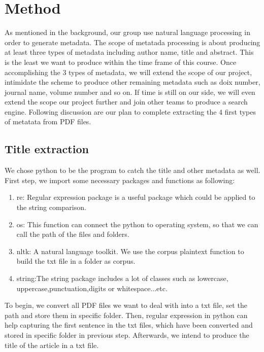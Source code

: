 \section*{Method}
As mentioned in the background, our group use natural language processing in order to generate metadata. 
The scope of metatada processing is about producing at least three types of metadata including author name, title and abstract. 
This is the least we want to produce within the time frame of this course. 
Once accomplishing the 3 types of metadata, we will extend the scope of our project, intimidate the scheme to produce other remaining metadata such as doix number, journal name, volume number and so on. 
If time is still on our side, we will even extend the scope our project further and join other teams to produce a search engine. 
Following discussion are our plan to complete extracting the 4 first types of metatata from PDF files.
\subsection*{Title extraction}
We chose python to be the program to catch the title and other metadata as well. 
First step, we import some necessary packages and functions as following:
\begin{enumerate}
	\item re: Regular expression package is a useful package which could be applied to the string comparison.
	\item os: This function can connect the python to operating system, so that we can call the path of the files and folders.
	\item nltk: A natural language toolkit. We use the corpus plaintext function to build the txt file in a folder as corpus.
	\item string:The string package includes a lot of classes such as lowercase, uppercase,punctuation,digits or whitespace...etc. 
\end{enumerate}  
To begin, we convert all PDF files we want to deal with into a txt file, set the path and store them in specific folder. 
Then, regular expression in python can help capturing the first sentence in the txt files, which have been converted and stored in specific folder in previous step. 
Afterwards, we intend to produce the title of the article in a txt file.   

